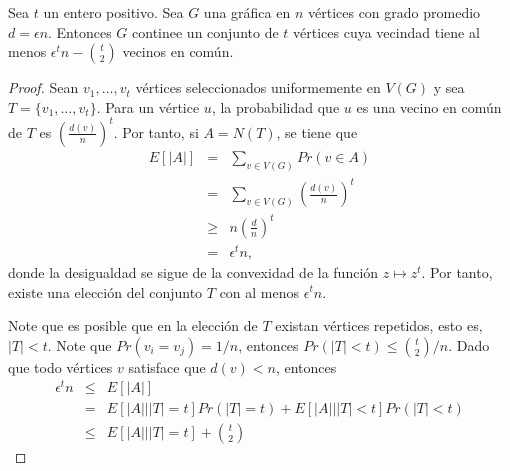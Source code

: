 \begin{theorem}
Sea $t$ un entero positivo. Sea $G$ una gráfica en $n$ vértices con
grado promedio $d = \epsilon n$.
Entonces $G$ continee un conjunto de $t$ vértices cuya vecindad
tiene al menos $\epsilon^t n - \binom{t}{2}$ vecinos en común.
\end{theorem}
\begin{proof} %
Sean $v_1, \ldots, v_t$ vértices seleccionados uniformemente en
$V(G)$ y sea $T = \{v_1, \ldots, v_t\}$. Para un vértice $u$, la
probabilidad que $u$ es una vecino en común de $T$ es
$\left(\frac{d(v)}{n}\right)^t$.
Por tanto, si $A = N(T)$, se tiene que
\begin{eqnarray*}
  E[\vert A \vert] &=& \sum_{v \in V(G)} Pr(v \in A) \\
  &=& \sum_{v \in V(G)} \left(\frac{d(v)}{n} \right)^t \\
  &\ge& n \left(\frac{d}{n}\right)^t\\
  &=& \epsilon^t n,
\end{eqnarray*}
donde la desigualdad se sigue de la convexidad de la función $z \mapsto z^t$.
Por tanto, existe una elección del conjunto $T$ con al menos $\epsilon^t n $.

Note que es posible que en la elección de $T$ existan vértices
repetidos, esto es, $\vert T \vert < t$. Note que $Pr(v_i = v_j) =
1 / n$, entonces
$Pr(\vert T \vert < t) \le \binom{t}{2} / n$. Dado que todo
vértices $v$ satisface que
$d(v) < n$, entonces
\begin{eqnarray*}
  \epsilon^t n &\le& E[\vert A \vert] \\
  &=& E[\vert A \vert | \vert T \vert = t] Pr(\vert T \vert = t) +
  E[\vert A \vert | \vert T \vert < t] Pr(\vert T \vert < t)  \\
  &\le& E[\vert A \vert | \vert T \vert = t] + \binom{t}{2}
\end{eqnarray*}
\end{proof}

